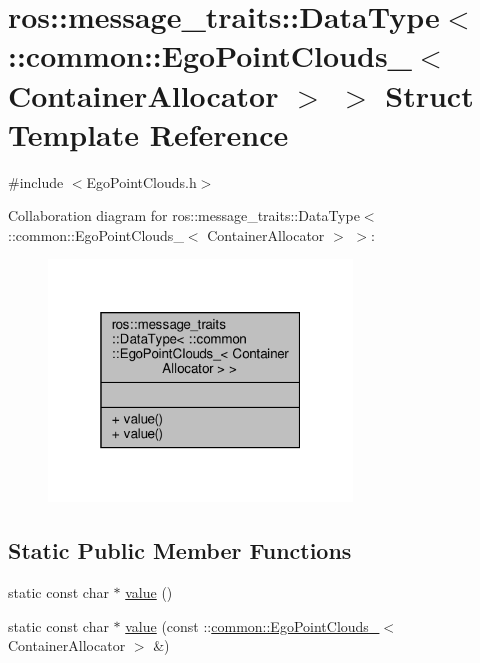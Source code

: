 \hypertarget{structros_1_1message__traits_1_1DataType_3_01_1_1common_1_1EgoPointClouds___3_01ContainerAllocator_01_4_01_4}{}\section{ros\+:\+:message\+\_\+traits\+:\+:Data\+Type$<$ \+:\+:common\+:\+:Ego\+Point\+Clouds\+\_\+$<$ Container\+Allocator $>$ $>$ Struct Template Reference}
\label{structros_1_1message__traits_1_1DataType_3_01_1_1common_1_1EgoPointClouds___3_01ContainerAllocator_01_4_01_4}


{\ttfamily \#include $<$Ego\+Point\+Clouds.\+h$>$}



Collaboration diagram for ros\+:\+:message\+\_\+traits\+:\+:Data\+Type$<$ \+:\+:common\+:\+:Ego\+Point\+Clouds\+\_\+$<$ Container\+Allocator $>$ $>$\+:\nopagebreak
\begin{figure}[H]
\begin{center}
\leavevmode
\includegraphics[width=229pt]{dc/d14/structros_1_1message__traits_1_1DataType_3_01_1_1common_1_1EgoPointClouds___3_01ContainerAllocator_01_4_01_4__coll__graph}
\end{center}
\end{figure}
\subsection*{Static Public Member Functions}
\begin{DoxyCompactItemize}
\item 
static const char $\ast$ \hyperlink{structros_1_1message__traits_1_1DataType_3_01_1_1common_1_1EgoPointClouds___3_01ContainerAllocator_01_4_01_4_a8476c03902d3c11699016f13f43c9b1c}{value} ()
\item 
static const char $\ast$ \hyperlink{structros_1_1message__traits_1_1DataType_3_01_1_1common_1_1EgoPointClouds___3_01ContainerAllocator_01_4_01_4_af2b4871b2096173d3bdbfb59aeccee60}{value} (const \+::\hyperlink{structcommon_1_1EgoPointClouds__}{common\+::\+Ego\+Point\+Clouds\+\_\+}$<$ Container\+Allocator $>$ \&)
\end{DoxyCompactItemize}


